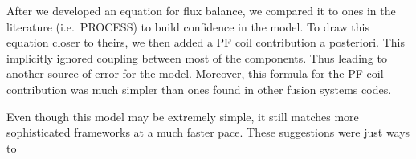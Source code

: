 After we developed an equation for flux balance, we compared it to ones in the literature (i.e.\ PROCESS) to build confidence in the model. To draw this equation closer to theirs, we then added a PF coil contribution a posteriori. This implicitly ignored coupling between most of the components. Thus leading to another source of error for the model. Moreover, this formula for the PF coil contribution was much simpler than ones found in other fusion systems codes.

Even though this model may be extremely simple, it still matches more sophisticated frameworks at a much faster pace. These suggestions were just ways to 

%
